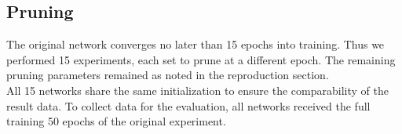 \subsection*{Pruning}
The original network converges no later than 15 epochs into training. Thus we performed 15 experiments, each set to prune at a different epoch. The remaining pruning parameters remained as noted in the reproduction section.\\
All 15 networks share the same initialization to ensure the comparability of the result data. To collect data for the evaluation, all networks received the full training 50 epochs of the original experiment.

